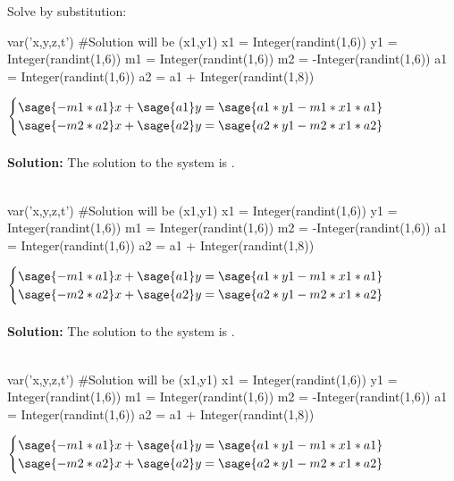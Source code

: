 \documentclass{ximera}
\begin{document}
\noindent Solve by substitution:
\begin{shuffle}[1]
\begin{question}
\begin{sagesilent}
var('x,y,z,t')
#Solution will be (x1,y1)
x1 = Integer(randint(1,6))
y1 = Integer(randint(1,6))
m1 = Integer(randint(1,6))
m2 = -Integer(randint(1,6)) 
a1 = Integer(randint(1,6))
a2 = a1 + Integer(randint(1,8))
\end{sagesilent}

$\begin{cases}
\sage{-m1*a1}x+\sage{a1}y=\sage{a1*y1-m1*x1*a1}\\
\sage{-m2*a2}x+\sage{a2}y=\sage{a2*y1-m2*x1*a2}\\
\end{cases}$\\\\

{\bf Solution:} The solution to the system is 
.\\\\
\end{question}

\begin{question}
\begin{sagesilent}
var('x,y,z,t')
#Solution will be (x1,y1)
x1 = Integer(randint(1,6))
y1 = Integer(randint(1,6))
m1 = Integer(randint(1,6))
m2 = -Integer(randint(1,6)) 
a1 = Integer(randint(1,6))
a2 = a1 + Integer(randint(1,8))
\end{sagesilent}
$\begin{cases}
\sage{-m1*a1}x+\sage{a1}y=\sage{a1*y1-m1*x1*a1}\\
\sage{-m2*a2}x+\sage{a2}y=\sage{a2*y1-m2*x1*a2}\\
\end{cases}$\\\\

{\bf Solution:} The solution to the system is 
.\\\\
\end{question}

\begin{question}
\begin{sagesilent}
var('x,y,z,t')
#Solution will be (x1,y1)
x1 = Integer(randint(1,6))
y1 = Integer(randint(1,6))
m1 = Integer(randint(1,6))
m2 = -Integer(randint(1,6)) 
a1 = Integer(randint(1,6))
a2 = a1 + Integer(randint(1,8))
\end{sagesilent}
$\begin{cases}
\sage{-m1*a1}x+\sage{a1}y=\sage{a1*y1-m1*x1*a1}\\
\sage{-m2*a2}x+\sage{a2}y=\sage{a2*y1-m2*x1*a2}\\
\end{cases}$\\\\


\end{question}
\end{shuffle}
\end{document}
